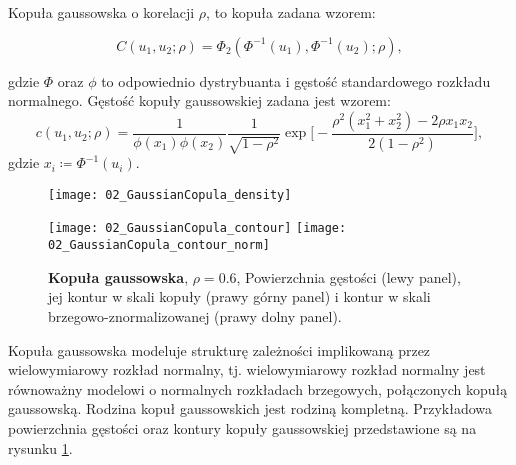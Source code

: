 \begin{df}
	Kopuła gaussowska o korelacji $\rho$, to kopuła zadana wzorem:
	
	$$ C(u_1, u_2; \rho) = \Phi_2(\Phi^{-1}(u_1), \Phi^{-1}(u_2);\rho),$$
	
	gdzie $\Phi$ oraz $\phi$ to odpowiednio dystrybuanta i gęstość standardowego rozkładu normalnego. Gęstość kopuły gaussowskiej zadana jest wzorem:
	$$ c(u_1, u_2; \rho) = \frac{1}{\phi(x_1)\phi(x_2)} \frac{1}{\sqrt{1-\rho^2}}\exp\bigg[-\frac{\rho^2(x_1^2+x_2^2) - 2\rho x_1 x_2}{2(1-\rho^2)}\bigg],$$
	gdzie $x_i\coloneqq \Phi^{-1}(u_i)$.
\end{df}
\begin{figure}[h]
	\centering
	\begin{minipage}{0.5\linewidth}
		\texttt{[image: 02\_GaussianCopula\_density]}
	\end{minipage}
	\begin{minipage}{0.45\linewidth}
		\texttt{[image: 02\_GaussianCopula\_contour]}
		\texttt{[image: 02\_GaussianCopula\_contour\_norm]}
	\end{minipage}
	\caption{\textbf{Kopuła gaussowska}, $\rho=0.6$, Powierzchnia gęstości (lewy panel), jej kontur w skali kopuły (prawy górny panel) i kontur w skali brzegowo-znormalizowanej (prawy dolny panel). \label{fig:gaussian_copula_density}}
\end{figure}

Kopuła gaussowska modeluje strukturę zależności implikowaną przez wielowymiarowy rozkład normalny, tj. wielowymiarowy rozkład normalny jest równoważny modelowi o normalnych rozkładach brzegowych, połączonych kopułą gaussowską. Rodzina kopuł gaussowskich jest rodziną kompletną. Przykładowa powierzchnia gęstości oraz kontury kopuły gaussowskiej przedstawione są na rysunku \ref{fig:gaussian_copula_density}.

